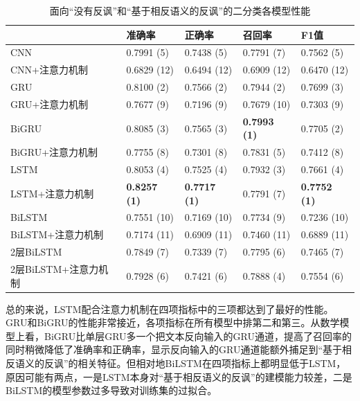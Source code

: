 \begin{table}[htb]
  \centering
  \begin{minipage}[t]{\linewidth}
  \caption{面向“没有反讽”和“基于相反语义的反讽”的二分类各模型性能}
  \label{tab:exp_irony_det_Bb01_result}
    \begin{tabularx}{\linewidth}{X|llll}
    \toprule[1.5pt]
    & 准确率 & 正确率 & 召回率 & F1值 \\
    \hline
    CNN & 0.7991 (5) & 0.7438 (5) & 0.7791 (7) & 0.7562 (5) \\ %
    CNN+注意力机制 & 0.6829 (12) & 0.6494 (12) & 0.6909 (12) & 0.6470 (12) \\ %
    \hline
    GRU & 0.8100 (2) & 0.7566 (2) & 0.7944 (2) & 0.7699 (3) \\ %
    GRU+注意力机制 & 0.7677 (9) & 0.7196 (9) & 0.7679 (10) & 0.7303 (9) \\ %
    \hline
    BiGRU & 0.8085 (3) & 0.7565 (3) & \bf 0.7993 (1) & 0.7705 (2) \\ %
    BiGRU+注意力机制 & 0.7755 (8) & 0.7301 (8) & 0.7831 (5) & 0.7412 (8) \\ %
    \hline
    LSTM & 0.8053 (4) & 0.7525 (4) & 0.7932 (3) & 0.7661 (4) \\ %
    LSTM+注意力机制 & \bf 0.8257 (1) & \bf 0.7717 (1) & 0.7791 (7) & \bf 0.7752 (1) \\ %
    \hline
    BiLSTM & 0.7551 (10) & 0.7169 (10) & 0.7734 (9) & 0.7236 (10) \\ %
    BiLSTM+注意力机制 & 0.7174 (11) & 0.6909 (11) & 0.7460 (11) & 0.6889 (11) \\ %
    \hline
    2层BiLSTM & 0.7849 (7) & 0.7339 (7) & 0.7795 (6) & 0.7465 (7) \\ %
    2层BiLSTM+注意力机制 & 0.7928 (6) & 0.7421 (6) & 0.7888 (4) & 0.7554 (6) \\ %
    \bottomrule[1.5pt]
    \end{tabularx}
  \end{minipage}
\end{table}

总的来说，LSTM配合注意力机制在四项指标中的三项都达到了最好的性能。GRU和BiGRU的性能非常接近，各项指标在所有模型中排第二和第三。从数学模型上看，BiGRU比单层GRU多一个把文本反向输入的GRU通道，提高了召回率的同时稍微降低了准确率和正确率，显示反向输入的GRU通道能额外捕足到“基于相反语义的反讽”的相关特征。但相对地BiLSTM在四项指标上都明显低于LSTM，原因可能有两点，一是LSTM本身对“基于相反语义的反讽”的建模能力较差，二是BiLSTM的模型参数过多导致对训练集的过拟合。

